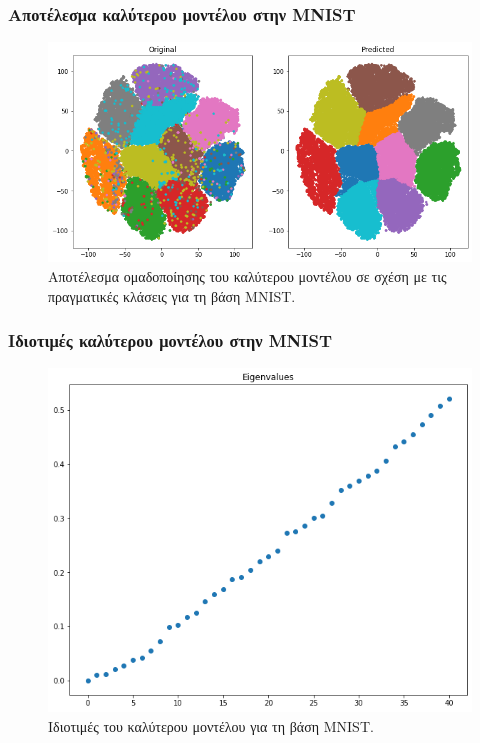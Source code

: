\documentclass{beamer}
\begin{document}
\begin{frame}
\frametitle{Αποτέλεσμα καλύτερου μοντέλου στην MNIST}

\begin{figure}[H]
    \centering
    \includegraphics[width=0.8\linewidth]{mnist/best_model_results.png}
    \caption{Αποτέλεσμα ομαδοποίησης του καλύτερου μοντέλου σε σχέση με τις
    πραγματικές κλάσεις για τη βάση MNIST.}
    \label{fig:mnist_best_model_results}
\end{figure}

\end{frame}

\begin{frame}
\frametitle{Ιδιοτιμές καλύτερου μοντέλου στην MNIST}

\begin{figure}[H]
    \centering
    \includegraphics[width=0.6\linewidth]{mnist/eigenvalues.png}
    \caption{Ιδιοτιμές του καλύτερου μοντέλου για τη βάση MNIST.}
    \label{fig:mnist_eigenvalues}
\end{figure}

\end{frame}
\end{document}
